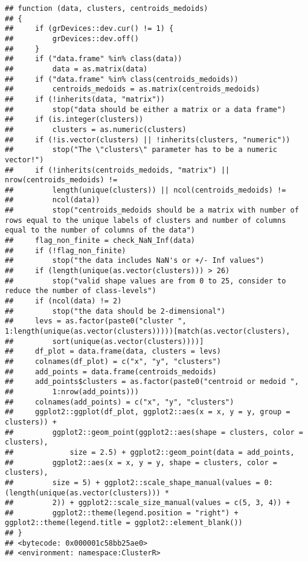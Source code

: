 \documentclass[
]{article}
\begin{document}
\begin{verbatim}
## function (data, clusters, centroids_medoids) 
## {
##     if (grDevices::dev.cur() != 1) {
##         grDevices::dev.off()
##     }
##     if ("data.frame" %in% class(data)) 
##         data = as.matrix(data)
##     if ("data.frame" %in% class(centroids_medoids)) 
##         centroids_medoids = as.matrix(centroids_medoids)
##     if (!inherits(data, "matrix")) 
##         stop("data should be either a matrix or a data frame")
##     if (is.integer(clusters)) 
##         clusters = as.numeric(clusters)
##     if (!is.vector(clusters) || !inherits(clusters, "numeric")) 
##         stop("The \"clusters\" parameter has to be a numeric vector!")
##     if (!inherits(centroids_medoids, "matrix") || nrow(centroids_medoids) != 
##         length(unique(clusters)) || ncol(centroids_medoids) != 
##         ncol(data)) 
##         stop("centroids_medoids should be a matrix with number of rows equal to the unique labels of clusters and number of columns equal to the number of columns of the data")
##     flag_non_finite = check_NaN_Inf(data)
##     if (!flag_non_finite) 
##         stop("the data includes NaN's or +/- Inf values")
##     if (length(unique(as.vector(clusters))) > 26) 
##         stop("valid shape values are from 0 to 25, consider to reduce the number of class-levels")
##     if (ncol(data) != 2) 
##         stop("the data should be 2-dimensional")
##     levs = as.factor(paste0("cluster ", 1:length(unique(as.vector(clusters)))))[match(as.vector(clusters), 
##         sort(unique(as.vector(clusters))))]
##     df_plot = data.frame(data, clusters = levs)
##     colnames(df_plot) = c("x", "y", "clusters")
##     add_points = data.frame(centroids_medoids)
##     add_points$clusters = as.factor(paste0("centroid or medoid ", 
##         1:nrow(add_points)))
##     colnames(add_points) = c("x", "y", "clusters")
##     ggplot2::ggplot(df_plot, ggplot2::aes(x = x, y = y, group = clusters)) + 
##         ggplot2::geom_point(ggplot2::aes(shape = clusters, color = clusters), 
##             size = 2.5) + ggplot2::geom_point(data = add_points, 
##         ggplot2::aes(x = x, y = y, shape = clusters, color = clusters), 
##         size = 5) + ggplot2::scale_shape_manual(values = 0:(length(unique(as.vector(clusters))) * 
##         2)) + ggplot2::scale_size_manual(values = c(5, 3, 4)) + 
##         ggplot2::theme(legend.position = "right") + ggplot2::theme(legend.title = ggplot2::element_blank())
## }
## <bytecode: 0x000001c58bb25ae0>
## <environment: namespace:ClusterR>
\end{verbatim}
\end{document}
